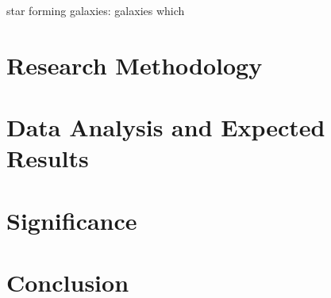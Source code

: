 \documentclass{article}
\begin{document}
star forming galaxies:
galaxies which 

\section{Research Methodology}
\section{Data Analysis and Expected Results}
\section{Significance}
\section{Conclusion}



\end{document}
